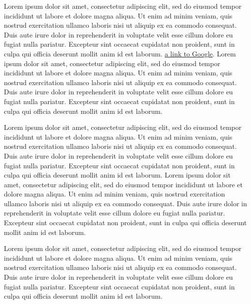 \documentclass[12pt,sigleft,dateno,stdletter]{newlfm}
\begin{document}
\begin{newlfm}

Lorem ipsum dolor sit amet, consectetur adipiscing elit, sed do eiusmod tempor incididunt ut labore et dolore magna aliqua.
Ut enim ad minim veniam, quis nostrud exercitation ullamco laboris nisi ut aliquip ex ea commodo consequat. 
Duis aute irure dolor in reprehenderit in voluptate velit esse cillum dolore eu fugiat nulla pariatur. 
Excepteur sint occaecat cupidatat non proident, sunt in culpa qui officia deserunt mollit anim id est laborum. 
\href{www.google.com}{a link to Google}. 
Lorem ipsum dolor sit amet, consectetur adipiscing elit, sed do eiusmod tempor incididunt ut labore et dolore magna aliqua.
Ut enim ad minim veniam, quis nostrud exercitation ullamco laboris nisi ut aliquip ex ea commodo consequat. 
Duis aute irure dolor in reprehenderit in voluptate velit esse cillum dolore eu fugiat nulla pariatur. 
Excepteur sint occaecat cupidatat non proident, sunt in culpa qui officia deserunt mollit anim id est laborum. 

Lorem ipsum dolor sit amet, consectetur adipiscing elit, sed do eiusmod tempor incididunt ut labore et dolore magna aliqua.
Ut enim ad minim veniam, quis nostrud exercitation ullamco laboris nisi ut aliquip ex ea commodo consequat. 
Duis aute irure dolor in reprehenderit in voluptate velit esse cillum dolore eu fugiat nulla pariatur. 
Excepteur sint occaecat cupidatat non proident, sunt in culpa qui officia deserunt mollit anim id est laborum. Lorem ipsum dolor sit amet, consectetur adipiscing elit, sed do eiusmod tempor incididunt ut labore et dolore magna aliqua.
Ut enim ad minim veniam, quis nostrud exercitation ullamco laboris nisi ut aliquip ex ea commodo consequat. 
Duis aute irure dolor in reprehenderit in voluptate velit esse cillum dolore eu fugiat nulla pariatur. 
Excepteur sint occaecat cupidatat non proident, sunt in culpa qui officia deserunt mollit anim id est laborum. 

Lorem ipsum dolor sit amet, consectetur adipiscing elit, sed do eiusmod tempor incididunt ut labore et dolore magna aliqua.
Ut enim ad minim veniam, quis nostrud exercitation ullamco laboris nisi ut aliquip ex ea commodo consequat. 
Duis aute irure dolor in reprehenderit in voluptate velit esse cillum dolore eu fugiat nulla pariatur. 
Excepteur sint occaecat cupidatat non proident, sunt in culpa qui officia deserunt mollit anim id est laborum. 


\end{newlfm}
\end{document}
